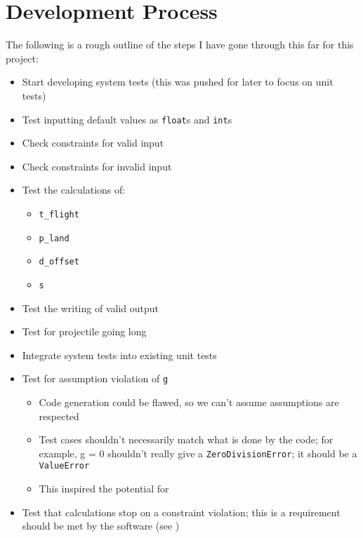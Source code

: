 \chapter{Development Process}
\label{chap:dev-proc}

The following is a rough outline of the steps I have gone through this far for
this project:

\begin{itemize}
    \item Start developing system tests (this was pushed for later to
          focus on unit tests)
    \item Test inputting default values as \texttt{float}s and \texttt{int}s
    \item Check constraints for valid input
    \item Check constraints for invalid input
    \item Test the calculations of:
          \begin{itemize}
              \item \texttt{t\_flight}
              \item \texttt{p\_land}
              \item \texttt{d\_offset}
              \item \texttt{s}
          \end{itemize}
    \item Test the writing of valid output
    \item Test for projectile going long
    \item Integrate system tests into existing unit tests
    \item Test for assumption violation of \texttt{g}
          \begin{itemize}
              \item Code generation could be flawed, so we can't assume
                    assumptions are respected
              \item Test cases shouldn't necessarily match what is done by the
                    code; for example, g = 0 shouldn't really give a
                    \texttt{ZeroDivisionError}; it should be a \texttt{ValueError}
              \item This inspired the potential for
          \end{itemize}
    \item Test that calculations stop on a constraint violation; this is a
          requirement should be met by the software (see )

\end{itemize}
